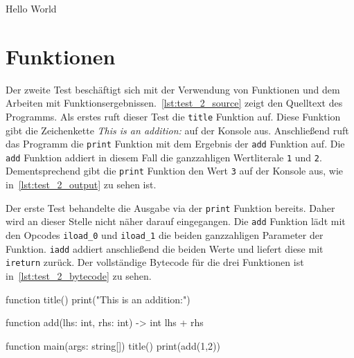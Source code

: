 \begin{ToyaCode}[numbers=none, caption={Konsolen-Ausgabe des Hello World Programms},label=lst:test_1_output]
Hello World    
\end{ToyaCode}

\section{Funktionen}

Der zweite Test beschäftigt sich mit der Verwendung von Funktionen und dem Arbeiten mit Funktionsergebnissen.~\autoref{lst:test_2_source} zeigt den Quelltext des Programms. Als erstes ruft dieser Test die \texttt{title} Funktion auf. Diese Funktion gibt die Zeichenkette \textit{This is an addition:} auf der Konsole aus. Anschließend ruft das Programm die \texttt{print} Funktion mit dem Ergebnis der \texttt{add} Funktion auf. Die \texttt{add} Funktion addiert in diesem Fall die ganzzahligen Wertliterale \texttt{1} und \texttt{2}. Dementsprechend gibt die \texttt{print} Funktion den Wert \texttt{3} auf der Konsole aus, wie in~\autoref{lst:test_2_output} zu sehen ist.

Der erste Test behandelte die Ausgabe via der \texttt{print} Funktion bereits. Daher wird an dieser Stelle nicht näher darauf eingegangen. Die \texttt{add} Funktion lädt mit den Opcodes \texttt{iload\_0} und \texttt{iload\_1} die beiden ganzzahligen Parameter der Funktion. \texttt{iadd} addiert anschließend die beiden Werte und liefert diese mit \texttt{ireturn} zurück. Der vollständige Bytecode für die drei Funktionen ist in~\autoref{lst:test_2_bytecode} zu sehen.

\begin{ToyaCode}[numbers=none, caption={Funktionen},label=lst:test_2_source]
function title() {
    print("This is an addition:")
}

function add(lhs: int, rhs: int) -> int {
    lhs + rhs
}

function main(args: string[]) {
    title()
    print(add(1,2))
}
\end{ToyaCode}  

